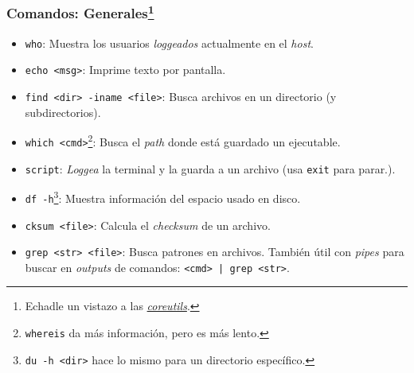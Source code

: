 \documentclass[aspectratio=43]{beamer}
\begin{document}
\begin{frame}
    \frametitle{Comandos: Generales\footnote{Echadle un vistazo a las \href{https://www.maizure.org/projects/decoded-gnu-coreutils/}{\textit{coreutils}}.}}

    \begin{itemize}
        \item \texttt{who}: Muestra los usuarios \textit{loggeados} actualmente en el \textit{host}.
        \item \texttt{echo <msg>}: Imprime texto por pantalla.
        \item \texttt{find <dir> -iname <file>}: Busca archivos en un directorio (y subdirectorios).
        \item \texttt{which <cmd>}\footnote{\texttt{whereis} da más información, pero es más lento.}: Busca el \textit{path} donde está guardado un ejecutable.
        \item \texttt{script}: \textit{Loggea} la terminal y la guarda a un archivo (usa \texttt{exit} para parar.).
        \item \texttt{df -h}\footnote{\texttt{du -h <dir>} hace lo mismo para un directorio específico.}: Muestra información del espacio usado en disco.
        \item \texttt{cksum <file>}: Calcula el \textit{checksum} de un archivo.
        \item \texttt{grep <str> <file>}: Busca patrones en archivos. También útil con \textit{pipes} para buscar en \textit{outputs} de comandos: \texttt{<cmd> | grep <str>}.
    \end{itemize}
\end{frame}
\end{document}
